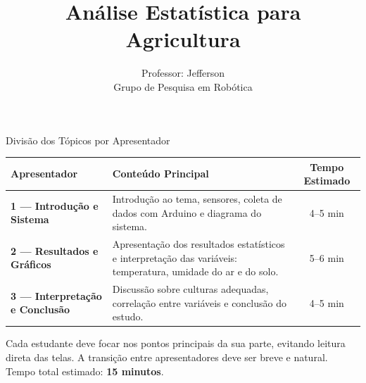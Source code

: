 \documentclass{beamer}
\title{Análise Estatística para Agricultura}
\author{
    Professor: Jefferson \\ 
    Grupo de Pesquisa em Robótica
}
\date{}
\begin{document}

\frame{\titlepage}


\begin{frame}{Divisão dos Tópicos por Apresentador}
    \scriptsize
\begin{table}[h!]
\centering
\begin{tabular}{|p{3cm}|p{4cm}|c|}
\hline
\textbf{Apresentador} & \textbf{Conteúdo Principal} & \textbf{Tempo Estimado} \\
\hline
\textbf{1 — Introdução e Sistema} &
Introdução ao tema, sensores, coleta de dados com Arduino e diagrama do sistema. &
4–5 min \\
\hline
\textbf{2 — Resultados e Gráficos} &
Apresentação dos resultados estatísticos e interpretação das variáveis: temperatura, umidade do ar e do solo. &
5–6 min \\
\hline
\textbf{3 — Interpretação e Conclusão} &
Discussão sobre culturas adequadas, correlação entre variáveis e conclusão do estudo. &
4–5 min \\
\hline
\end{tabular}
\end{table}

\begin{tcolorbox}[roteiro]
Cada estudante deve focar nos pontos principais da sua parte, evitando leitura direta das telas.  
A transição entre apresentadores deve ser breve e natural.  
Tempo total estimado: \textbf{15 minutos}.
\end{tcolorbox}
\end{frame}

\end{document}
